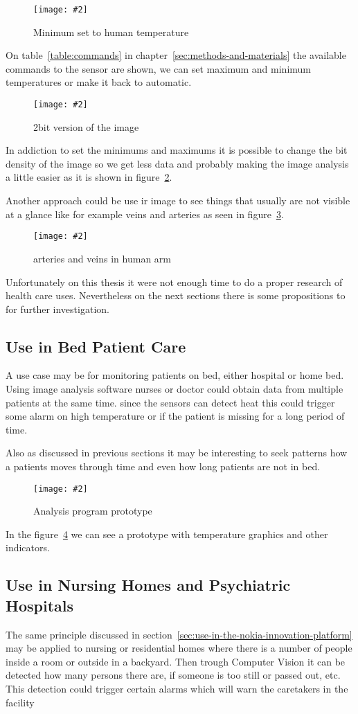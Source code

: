 \documentclass[hidelinks,11pt,a4paper,oneside,article]{memoir}
\newcommand{\putimage}[3][10] %
{
\begin{figure}[h]
	\centering
	\captionsetup{justification=centering}
	\texttt{[image: \#2]}
	\caption{#3}
	\label{fig:#2}
\end{figure}
}
\begin{document}
    \putimage{setminimum}{Minimum set to human temperature}

On table~\ref{table:commands} in chapter~\ref{sec:methods-and-materials} the available commands to the sensor are shown, we can set maximum and minimum temperatures or make it back to automatic.

    \putimage{2bit}{2bit version of the image}

In addiction to set the minimums and maximums it is possible to change the bit density of the image so we get less data and probably making the image analysis a little easier as it is shown in figure~\ref{fig:2bit}.

Another approach could be use \gls{ir} image to see things that usually are not visible at a glance like for example veins and arteries as seen in figure~\ref{fig:vein}.

	\putimage{vein}{arteries and veins in human arm}
	
Unfortunately on this thesis it were not enough time to do a proper research of health care uses. Nevertheless on the next sections there is some propositions to for further investigation.

\subsection{Use in Bed Patient Care}
A use case may be for monitoring patients on bed, either hospital or home bed. Using image analysis software nurses or doctor could obtain data from multiple patients at the same time. since the sensors can detect heat this could trigger some alarm on high temperature or if the patient is missing for a long period of time.

Also as discussed in previous sections it may be interesting to seek patterns how a patients moves through time and even how long patients are not in bed.

    \putimage{fiber-detector-prototype}{Analysis program prototype}
    
In the figure~\ref{fig:fiber-detector-prototype} we can see a prototype with temperature graphics and other indicators.
    
\subsection{Use in Nursing Homes and Psychiatric Hospitals}

The same principle discussed in section~\ref{sec:use-in-the-nokia-innovation-platform} may be applied to nursing or residential homes where there is a number of people inside a room or outside in a backyard. Then trough Computer Vision it can be detected how many persons there are, if someone is too still or passed out, etc. This detection could trigger certain alarms which will warn the caretakers in the facility
\end{document}
